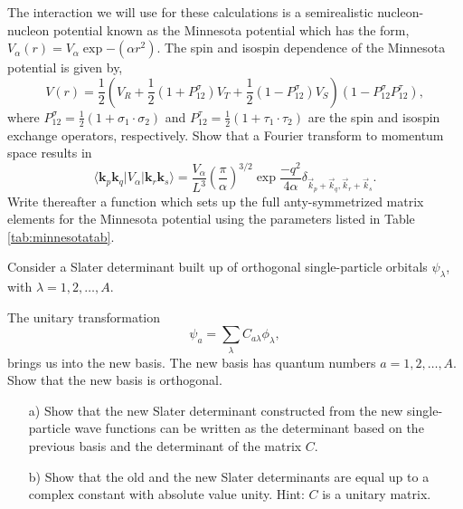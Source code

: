 \begin{problem}\label{problem:fourier}
The interaction we will use for these calculations is a semirealistic nucleon-nucleon potential known as the Minnesota potential \cite{minnesota} which has the form, $V_{\alpha}\left( r\right)=V_{\alpha}\exp{-(\alpha r^{2})}$. The spin and isospin dependence of the Minnesota potential is given by,
\[
V\left( r\right)=\frac{1}{2}\left( V_{R}+\frac{1}{2}\left( 1+P_{12}^{\sigma}\right) V_{T}+\frac{1}{2}\left( 1-P_{12}^{\sigma}\right) V_{S}\right)\left( 1-P_{12}^{\sigma}P_{12}^{\tau}\right),
\]
where $P_{12}^{\sigma}=\frac{1}{2}\left( 1+\sigma_{1}\cdot\sigma_{2}\right)$ and $P_{12}^{\tau}=\frac{1}{2}\left( 1+\tau_{1}\cdot\tau_{2}\right)$ are the spin and isospin exchange operators, respectively. 
Show that a Fourier transform to momentum space results in 
\[
\langle \mathbf{k}_p \mathbf{k}_q \vert V_{\alpha}\vert \mathbf{k}_r\mathbf{k}_s\rangle=\frac{V_{\alpha}}{L^{3}}\left(\frac{\pi}{\alpha}\right)^{3/2}\exp{\frac{-q^{2}}{4\alpha}}\delta_{\vec{k}_{p}+\vec{k}_{q},\vec{k}_{r}+\vec{k}_{s}}.
\]
Write thereafter a function which sets up the full anty-symmetrized matrix elements for the Minnesota potential using the parameters 
listed in Table \ref{tab:minnesotatab}. 
\end{problem}



\begin{prob}
Consider a Slater determinant built up of orthogonal single-particle orbitals $\psi_{\lambda}$, 
with $\lambda = 1,2,\dots,A$.

The unitary transformation
\[
\psi_a  = \sum_{\lambda} C_{a\lambda}\phi_{\lambda},
\]
brings us into the new basis.  
The new basis has quantum numbers $a=1,2,\dots,A$.
Show that the new basis is orthogonal.
\begin{enumerate}
\item[a)] Show that the new Slater determinant constructed from the new single-particle wave functions can be
written as the determinant based on the previous basis and the determinant of the matrix $C$.
\item[b)]
Show that the old and the new Slater determinants are equal up to a complex constant with absolute value unity.
Hint: $C$ is a unitary matrix. 
\end{enumerate}
\end{prob}


